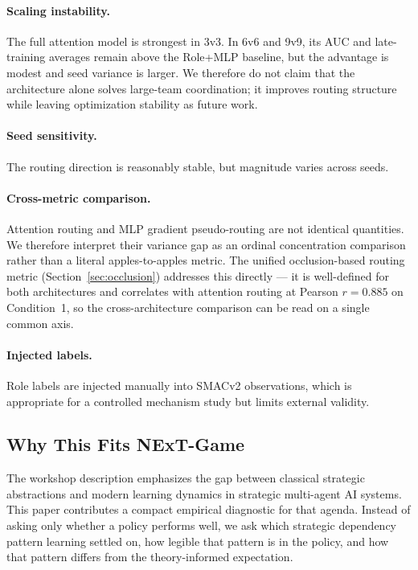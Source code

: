 \paragraph{Scaling instability.} The full attention model is strongest in 3v3. In 6v6 and 9v9, its AUC and late-training averages remain above the Role+MLP baseline, but the advantage is modest and seed variance is larger. We therefore do not claim that the architecture alone solves large-team coordination; it improves routing structure while leaving optimization stability as future work.

\paragraph{Seed sensitivity.} The routing direction is reasonably stable, but magnitude varies across seeds.

\paragraph{Cross-metric comparison.} Attention routing and MLP gradient pseudo-routing are not identical quantities. We therefore interpret their variance gap as an ordinal concentration comparison rather than a literal apples-to-apples metric. The unified occlusion-based routing metric (Section~\ref{sec:occlusion}) addresses this directly --- it is well-defined for both architectures and correlates with attention routing at Pearson $r{=}0.885$ on Condition~1, so the cross-architecture comparison can be read on a single common axis.

\paragraph{Injected labels.} Role labels are injected manually into SMACv2 observations, which is appropriate for a controlled mechanism study but limits external validity.

\subsection{Why This Fits NExT-Game}

The workshop description emphasizes the gap between classical strategic abstractions and modern learning dynamics in strategic multi-agent AI systems. This paper contributes a compact empirical diagnostic for that agenda. Instead of asking only whether a policy performs well, we ask which strategic dependency pattern learning settled on, how legible that pattern is in the policy, and how that pattern differs from the theory-informed expectation.
